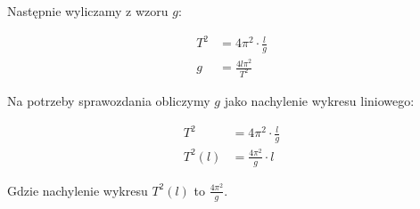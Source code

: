 \documentclass[a4paper,12pt]{article}
\begin{document}
Następnie wyliczamy z wzoru $g$:

\begin{align*}
	T^2 &= 4 \pi^2 \cdot \frac{l}{g} \\
	g &= \frac{4 l \pi^2 }{T^2}
\end{align*}

Na potrzeby sprawozdania obliczymy $g$ jako nachylenie wykresu liniowego:

\begin{align*}
	T^2 &= 4 \pi^2 \cdot \frac{l}{g} \\
	T^2\left(l\right) &= \frac{4 \pi^2}{g} \cdot l
\end{align*}

Gdzie nachylenie wykresu $T^2 \left(l\right)$ to $\frac{4 \pi^2}{g}$.



\end{document}
